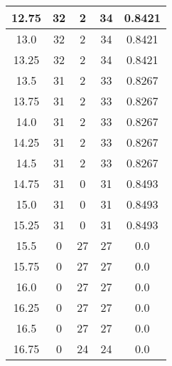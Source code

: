 \documentclass[letterpaper, 12pt]{article}
\begin{document}
\begin{longtable}{|c|c|c|c|c|}
\hline
12.75 & 32 & 2 & 34 & 0.8421 \\
\hline
13.0 & 32 & 2 & 34 & 0.8421 \\
\hline
13.25 & 32 & 2 & 34 & 0.8421 \\
\hline
13.5 & 31 & 2 & 33 & 0.8267 \\
\hline
13.75 & 31 & 2 & 33 & 0.8267 \\
\hline
14.0 & 31 & 2 & 33 & 0.8267 \\
\hline
14.25 & 31 & 2 & 33 & 0.8267 \\
\hline
14.5 & 31 & 2 & 33 & 0.8267 \\
\hline
14.75 & 31 & 0 & 31 & 0.8493 \\
\hline
15.0 & 31 & 0 & 31 & 0.8493 \\
\hline
15.25 & 31 & 0 & 31 & 0.8493 \\
\hline
15.5 & 0 & 27 & 27 & 0.0 \\
\hline
15.75 & 0 & 27 & 27 & 0.0 \\
\hline
16.0 & 0 & 27 & 27 & 0.0 \\
\hline
16.25 & 0 & 27 & 27 & 0.0 \\
\hline
16.5 & 0 & 27 & 27 & 0.0 \\
\hline
16.75 & 0 & 24 & 24 & 0.0 \\
\hline
\end{longtable}
\end{document}
